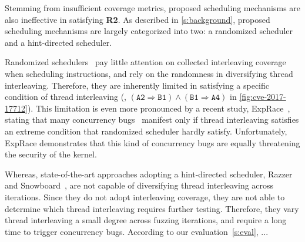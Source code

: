 %
Stemming from insufficient coverage metrics, proposed scheduling
mechanisms are also ineffective in satisfying \textbf{R2}.
%
As described in \autoref{s:background}, proposed scheduling mechanisms
are largely categorized into two: a randomized scheduler and a
hint-directed scheduler.

%
Randomized schedulers~\cite{krace, pctalgorithm, muzz, ski} pay little
attention on collected interleaving coverage when scheduling
instructions, and rely on the randomness in diversifying thread
interleaving.
%
Therefore, they are inherently limited in satisfying a specific
condition of thread interleaving (\eg,
$(\texttt{A2} \Rightarrow \texttt{B1}) \wedge (\texttt{B1} \Rightarrow
\texttt{A4})$ in \autoref{fig:cve-2017-17712}).
%
This limitation is even more pronounced by a recent study,
ExpRace~\cite{exprace}, stating that many concurrency
bugs~\cite{cve20196974, cve20191999, cve201911486} manifest only if
thread interleaving satisfies an extreme condition that randomized
scheduler hardly satisfy.
%
Unfortunately, ExpRace demonstrates that this kind of concurrency bugs
are equally threatening the security of the kernel.


Whereas, state-of-the-art approaches adopting a hint-directed
scheduler, Razzer~\cite{razzer} and Snowboard~\cite{snowboard}, are
not capable of diversifying thread interleaving across iterations.
%
Since they do not adopt interleaving coverage, they are not able to
determine which thread interleaving requires further
testing. Therefore, they vary thread interleaving a small degree
across fuzzing iterations, and require a long time to trigger
concurrency bugs.
%
According to our evaluation~\autoref{s:eval}, ...





